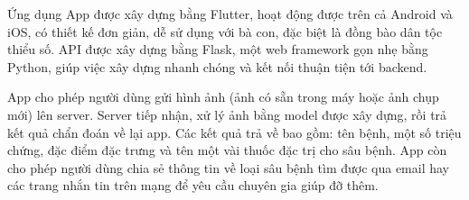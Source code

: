 \documentclass{beamer}
\begin{document}
\begin{frame}[allowframebreaks]{Ứng dụng}
	App được xây dựng bằng Flutter, hoạt động được trên cả Android và iOS, có thiết kế đơn giản, dễ sử dụng với bà con, đặc biệt là đồng bào dân tộc thiểu số. API được xây dựng bằng Flask, một web framework gọn nhẹ bằng Python, giúp việc xây dựng nhanh chóng và kết nối thuận tiện tới backend.

	\framebreak

	App cho phép người dùng gửi hình ảnh (ảnh có sẵn trong máy hoặc ảnh chụp mới) lên server. Server tiếp nhận, xử lý ảnh bằng model được xây dựng, rồi trả kết quả chẩn đoán về lại app. Các kết quả trả về bao gồm: tên bệnh, một số triệu chứng, đặc điểm đặc trưng và tên một vài thuốc đặc trị cho sâu bệnh. App còn cho phép người dùng chia sẻ thông tin về loại sâu bệnh tìm được qua email hay các trang nhắn tin trên mạng để yêu cầu chuyên gia giúp đỡ thêm.
\end{frame}
\end{document}
